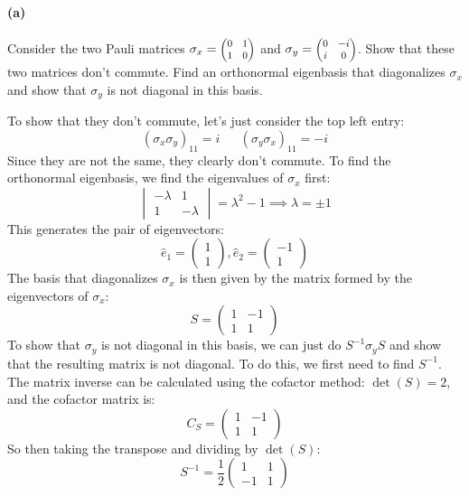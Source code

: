 \documentclass{article}
\begin{document}
\paragraph{(a)}
Consider the two Pauli matrices $\sigma_{x} = \smmatrix{0.8}{0&1\\1&0}$ and $\sigma_{y} = \smmatrix{0.8}{0 & -i \\ i & 0}$.  Show that these two matrices don't
commute.  Find an orthonormal eigenbasis that diagonalizes $\sigma_{x}$ and show that $\sigma_{y}$ is not diagonal in this basis.

\begin{solution}
	To show that they don't commute, let's just consider the top left entry:
	\[
		(\sigma_x \sigma_y )_{11} = i \phantom{aaa} (\sigma_y \sigma_x)_{11} = -i
	\] 
	Since they are not the same, they clearly don't commute. To find the orthonormal eigenbasis, we find
	the eigenvalues of $\sigma_x$ first:
	\[
		\begin{vmatrix} -\lambda & 1\\1 & -\lambda\end{vmatrix} = \lambda^2 - 1 \implies \lambda = \pm 1
	\] 
	This generates the pair of eigenvectors:
	\[
	\hat{e}_1 = \begin{pmatrix} 1\\1 \end{pmatrix}, \hat{e}_2 = \begin{pmatrix} -1 \\1 \end{pmatrix} 
	\] 
	The basis that diagonalizes $\sigma_x$ is then given by the matrix formed by the eigenvectors of $\sigma_x$:
	\[
		S = \begin{pmatrix} 1 & -1 \\ 1 & 1 \end{pmatrix} 
	\] 
	To show that $\sigma_y$ is not diagonal in this basis, we can just do $S^{-1}\sigma_y S$ and show that 
	the resulting matrix is not diagonal. To do this, we first need to find $S^{-1}$. The matrix 
	inverse can be calculated using the cofactor method: $\det(S) = 2$, and the cofactor matrix is:
	\[
		C_S = \begin{pmatrix} 1 & -1 \\ 1 & 1 \end{pmatrix} 
	\] 
	So then taking the transpose and dividing by $\det(S)$:
	\[
		S^{-1} = \frac{1}{2} \begin{pmatrix} 1 & 1\\ -1 & 1 \end{pmatrix} 
\]
\end{solution}
\end{document}
